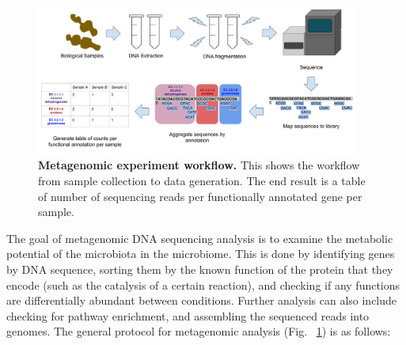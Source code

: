 \begin{figure}[h]
\begin{center}
\includegraphics[width=0.95\textwidth]{Metagenomic_pipeline.png}
\caption[Metagenomic experiment workflow.]{\textbf{Metagenomic experiment workflow.} This shows the workflow from sample collection to data generation. The end result is a table of number of sequencing reads per functionally annotated gene per sample.}
\label{metagenomic_workflow}
\end{center}
\end{figure}

The goal of metagenomic DNA sequencing analysis is to examine the metabolic potential of the microbiota in the microbiome. This is done by identifying genes by DNA sequence, sorting them by the known function of the protein that they encode (such as the catalysis of a certain reaction), and checking if any functions are differentially abundant between conditions. Further analysis can also include checking for pathway enrichment, and assembling the sequenced reads into genomes. The general protocol for metagenomic analysis (Fig. ~\ref{metagenomic_workflow}) is as follows:

